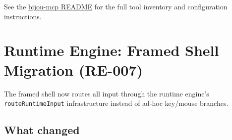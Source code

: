 See the \href{https://github.com/flyingrobots/bijou/blob/cbd70612140e7a450d764b3c7be1c6af878b99bc/docs/packages/bijou-mcp/README.md}{bijou-mcp README} for the full tool inventory and configuration instructions.

\section{Runtime Engine: Framed Shell Migration (RE-007)}\label{record-276-runtime-engine-framed-shell-migration-re-007}

The framed shell now routes all input through the runtime engine's \texttt{r\allowbreak{}o\allowbreak{}u\allowbreak{}t\allowbreak{}e\allowbreak{}R\allowbreak{}u\allowbreak{}n\allowbreak{}t\allowbreak{}i\allowbreak{}m\allowbreak{}e\allowbreak{}I\allowbreak{}n\allowbreak{}p\allowbreak{}u\allowbreak{}t} infrastructure instead of ad-hoc key/mouse branches.

\subsection{What changed}\label{record-276-what-changed}

